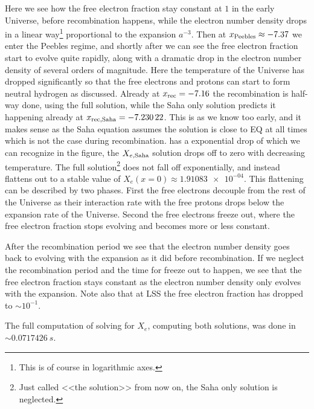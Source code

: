 \documentclass[10pt,a4paper]{article}
\begin{document}
Here we see how the free electron fraction stay constant at $1$ in the early Universe, before recombination happens, while the electron number density drops in a linear way\footnote{This is of course in logarithmic axes.} proportional to the expansion $a^{-3}$.
Then at $x_{\rm{Peebles}} \approx \num{-7.37}$ we enter the Peebles regime, and shortly after we can see the free electron fraction start to evolve quite rapidly, along with a dramatic drop in the electron number density of several orders of magnitude. Here the temperature of the Universe has dropped significantly so that the free electrons and protons can start to form neutral hydrogen as discussed. Already at $x_{\rm{rec}} = -7.16$ the recombination is half-way done, using the full solution, while the Saha only solution predicts it happening already at $x_{\rm{rec,Saha}} = \num{-7.23022}$. This is as we know too early, and it makes sense as the Saha equation assumes the solution is close to EQ at all times which is not the case during recombination.  has a exponential drop of which we can recognize in the figure, the $X_{e,\rm{Saha}}$ solution drops off to zero with decreasing temperature.
The full solution\footnote{Just called <<the solution>> from now on, the Saha only solution is neglected.} does not fall off exponentially, and instead flattens out to a stable value of $X_e(x=0) \approx \num{1.91083e-04}$. This flattening can be described by two phases. First the free electrons decouple from the rest of the Universe as their interaction rate with the free protons drops below the expansion rate of the Universe. Second the free electrons freeze out, where the free electron fraction stops evolving and becomes more or less constant. 

After the recombination period we see that the electron number density goes back to evolving with the expansion as it did before recombination. If we neglect the recombination period and the time for freeze out to happen, we see that the free electron fraction stays constant as the electron number density only evolves with the expansion. Note also that at LSS the free electron fraction has dropped to $\sim 10^{-1}$.

The full computation of solving for $X_e$, computing both solutions, was done in $\sim \SI{0.0717426}{s}$.
\end{document}
